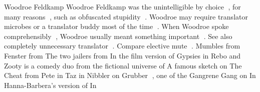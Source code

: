 Woodroe Feldkamp
Woodroe Feldkamp was the unintelligible by choice , for many reasons , such as obfuscated stupidity . Woodroe may require translator microbes or a translator buddy most of the time . When Woodroe spoke comprehensibly , Woodroe usually meant something important . See also completely unnecessary translator . Compare elective mute . Mumbles from Fenster from The two jailers from In the film version of Gypsies in Rebo and Zooty is a comedy duo from the fictional universe of A famous sketch on The Cheat from Pete in Taz in Nibbler on Grubber , one of the Gangrene Gang on In Hanna-Barbera's version of In

